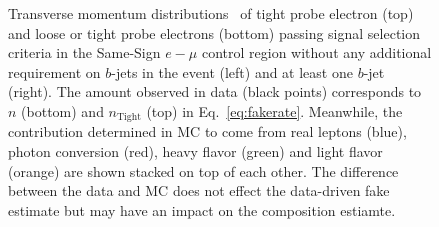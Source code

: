 \begin{figure}[h!]
{}
\vspace{-10mm}\caption{Transverse momentum distributions \pt\ of tight probe electron (top) and loose or tight probe electrons (bottom) passing signal selection criteria in the Same-Sign $e-\mu$ control region without any additional requirement on $b$-jets in the event (left) and at least one $b$-jet (right).
The amount observed in data (black points) corresponds to $n$ (bottom) and $n_{\textrm{Tight}}$ (top) in Eq.~\ref{eq:fakerate}. 
Meanwhile, the contribution determined in MC to come from real leptons (blue), photon conversion (red), heavy flavor (green) and light
flavor (orange) are shown stacked on top of each other.
The difference between the data and MC does not effect the data-driven
fake estimate but may have an impact on the composition estiamte.
}
\label{fig:fakeEff_CRs_electron_stacked}
\end{figure}



